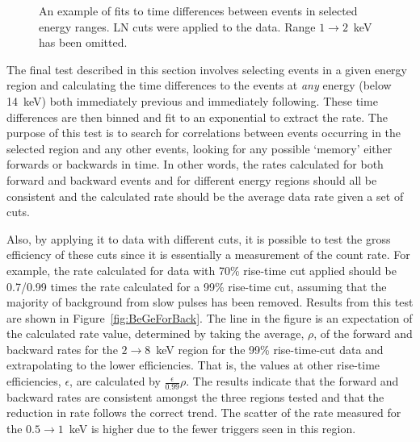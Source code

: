 			\begin{sidewaysfigure}
				\centering
				\def\figwidth{0.45\textheight}
				\def\plotname{LNExponential}
				\subfigure[$0.45\to0.55$~keV]{
					\texttt{[image: \\plotname\_0.45\_0.55]}
					\label{fig:\plotname45to55}
				}			
				\subfigure[$0.5\to1$~keV]{
					\texttt{[image: \\plotname\_0.5\_1]}
					\label{fig:\plotname5to1}
				}
				\subfigure[$3\to8$~keV]{
					\texttt{[image: \\plotname\_3\_8]}
					\label{fig:\plotname3to8}
				}
				\subfigure[$10\to10.76$~keV]{
					\texttt{[image: \\plotname\_10\_10.76]}
					\label{fig:\plotname10to1076}
				}									
				
				\caption[Fits to time differences between events in selected energy ranges]
				{An example of fits to time differences between events in selected energy ranges.  
				LN cuts were applied to the data.  Range $1\to2$~keV has been omitted.}
				\label{fig:BeGeExpFits}
			\end{sidewaysfigure}
			
	The final test described in this section involves selecting events in a given energy region and calculating the time differences to the events at \emph{any} energy (below 14~keV) both immediately previous and immediately following.  These time differences are then binned and fit to an exponential to extract the rate.  The purpose of this test is to search for correlations between events occurring in the selected region and any other events, looking for any possible `memory' either forwards or backwards in time.  In other words, the rates calculated for both forward and backward events and for different energy regions should all be consistent and the calculated rate should be the average data rate given a set of cuts.  
	
	Also, by applying it to data with different cuts, it is possible to test the gross efficiency of these cuts since it is essentially a measurement of the count rate.  For example, the rate calculated for data with 70\% rise-time cut applied should be 0.7/0.99 times the rate calculated for a 99\% rise-time cut, assuming that the majority of background from slow pulses has been removed.  Results from this test are shown in Figure~\ref{fig:BeGeForBack}.  The line in the figure is an expectation of the calculated rate value, determined by taking the average, $\rho$, of the forward and backward rates for the $2\to8$~keV region for the 99\% rise-time-cut data and extrapolating to the lower efficiencies.  That is, the values at other rise-time efficiencies,  $\epsilon$, are calculated by $\frac{\epsilon}{0.99}\rho$.  The results indicate that the forward and backward rates are consistent amongst the three regions tested and that the reduction in rate follows the correct trend.  The scatter of the rate measured for the $0.5\to1$~keV is higher due to the fewer triggers seen in this region.
	
